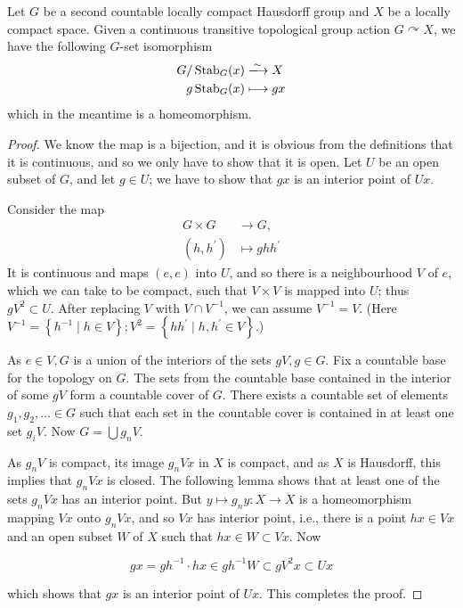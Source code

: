 \documentclass{report}
\def\acts{\curvearrowright}
\begin{document}
\begin{proposition}{}{}
	Let $G$ be a second countable locally compact Hausdorff group and $X$ be a locally compact space. Given a continuous transitive topological group action $G \acts X$, we have the following $G$-set isomorphism
	$$
		\begin{aligned}
			G / \operatorname{Stab}_G(x) & \xlongrightarrow{\sim} X \\
			g\operatorname{Stab}_G(x)    & \longmapsto g x
		\end{aligned}
	$$
	which in the meantime is a homeomorphism.
\end{proposition}
\begin{proof}
	We know the map is a bijection, and it is obvious from the definitions that it is continuous, and so we only have to show that it is open. Let $U$ be an open subset of $G$, and let $g \in U$; we have to show that $g x$ is an interior point of $U x$.

	Consider the map
	\begin{align*}
		G \times G &\longrightarrow G,\\
		\left(h, h^{\prime}\right) &\longmapsto g h h^{\prime}
	\end{align*}
	It is continuous and maps $(e, e)$ into $U$, and so there is a neighbourhood $V$ of $e$, which we can take to be compact, such that $V \times V$ is mapped into $U$; thus $g V^2 \subset U$. After replacing $V$ with $V \cap V^{-1}$, we can assume $V^{-1}=V$. (Here $V^{-1}=\left\{h^{-1} \mid h \in V\right\} ; V^2=\left\{h h^{\prime} \mid h, h^{\prime} \in V\right\}$.)
	
	As $e \in V, G$ is a union of the interiors of the sets $g V, g \in G$. Fix a countable base for the topology on $G$. The sets from the countable base contained in the interior of some $g V$ form a countable cover of $G$. There exists a countable set of elements $g_1, g_2, \ldots \in G$ such that each set in the countable cover is contained in at least one set $g_i V$. Now $G=\bigcup g_n V$.
	
	As $g_n V$ is compact, its image $g_n V x$ in $X$ is compact, and as $X$ is Hausdorff, this implies that $g_n V x$ is closed. The following lemma shows that at least one of the sets $g_n V x$ has an interior point. But $y \mapsto g_n y: X \rightarrow X$ is a homeomorphism mapping $V x$ onto $g_n V x$, and so $V x$ has interior point, i.e., there is a point $h x \in V x$ and an open subset $W$ of $X$ such that $h x \in W \subset V x$. Now
	
	$$
	g x=g h^{-1} \cdot h x \in g h^{-1} W \subset g V^2 x \subset U x
	$$
	
	which shows that $g x$ is an interior point of $U x$. This completes the proof.
\end{proof}
\end{document}
